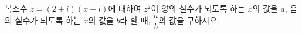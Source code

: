 복소수 $z=(2+i)(x-i)$에 대하여 $z^2$이 양의 실수가 되도록 하는 $x$의 값을 $a$, 음의 실수가 되도록 하는 $x$의 값을 $b$라 할 때, $\dfrac{a}{b}$의 값을 구하시오. 

